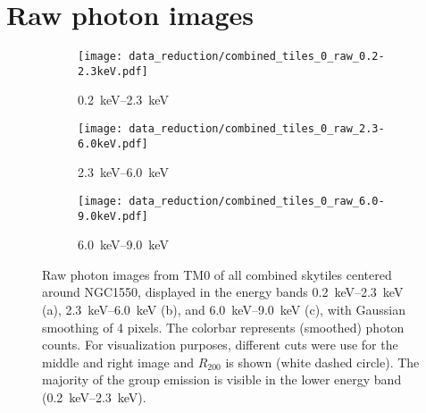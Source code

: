\section{Raw photon images}\label{sec:raw_photon}
%
\begin{figure}[htbp]
    \centering
    \begin{subfigure}{0.325\textwidth}
        \centering
        \texttt{[image: data\_reduction/combined\_tiles\_0\_raw\_0.2-2.3keV.pdf]}
        \caption{\SIrange{0.2}{2.3}{\kilo\electronvolt}}
        \label{fig:low_energy}
    \end{subfigure}
    \hfill
    \begin{subfigure}{0.325\textwidth}
        \centering
        \texttt{[image: data\_reduction/combined\_tiles\_0\_raw\_2.3-6.0keV.pdf]}
        \caption{\SIrange{2.3}{6.0}{\kilo\electronvolt}}
        \label{fig:mid_energy}
    \end{subfigure}
    \hfill
    \begin{subfigure}{0.325\textwidth}
        \centering
        \texttt{[image: data\_reduction/combined\_tiles\_0\_raw\_6.0-9.0keV.pdf]}
        \caption{\SIrange{6.0}{9.0}{\kilo\electronvolt}}
        \label{fig:high_energy}
    \end{subfigure}
    \caption[Raw photon images from TM0 of all combined skytiles centered around NGC1550 displayed at different energy bands.]{Raw photon images from TM0 of all combined skytiles centered around NGC1550, displayed in the energy bands \SIrange{0.2}{2.3}{\kilo\electronvolt} (a), \SIrange{2.3}{6.0}{\kilo\electronvolt} (b), and \SIrange{6.0}{9.0}{\kilo\electronvolt} (c), with Gaussian smoothing of 4 pixels. The colorbar represents (smoothed) photon counts. For visualization purposes, different cuts were use for the middle and right image and \(R_{200}\) is shown (white dashed circle). The majority of the group emission is visible in the lower energy band (\SIrange{0.2}{2.3}{\kilo\electronvolt}).}
    \label{fig:raw_photon_images}
\end{figure}
%
